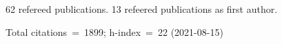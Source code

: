62 refereed publications. 13 refeered publications as first author.

Total citations~=~1899; h-index~=~22 (2021-08-15)